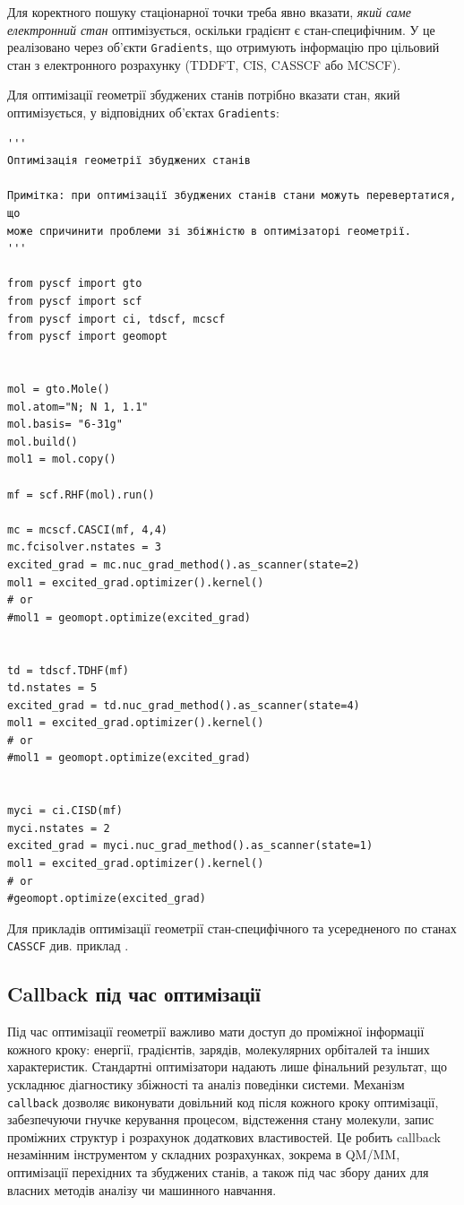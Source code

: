 Для коректного пошуку стаціонарної точки треба явно вказати,
\emph{який саме електронний стан} оптимізується, оскільки градієнт є
стан-специфічним. У \PySCF{} це реалізовано через об’єкти
\texttt{Gradients}, що отримують інформацію про цільовий стан з
електронного розрахунку (TDDFT, CIS, CASSCF або MCSCF).


Для оптимізації геометрії збуджених станів потрібно вказати стан, який оптимізується, у відповідних об'єктах \texttt{Gradients}:

\begin{verbatim}
'''
Оптимізація геометрії збуджених станів

Примітка: при оптимізації збуджених станів стани можуть перевертатися, що
може спричинити проблеми зі збіжністю в оптимізаторі геометрії.
'''

from pyscf import gto
from pyscf import scf
from pyscf import ci, tdscf, mcscf
from pyscf import geomopt


mol = gto.Mole()
mol.atom="N; N 1, 1.1"
mol.basis= "6-31g"
mol.build()
mol1 = mol.copy()

mf = scf.RHF(mol).run()

mc = mcscf.CASCI(mf, 4,4)
mc.fcisolver.nstates = 3
excited_grad = mc.nuc_grad_method().as_scanner(state=2)
mol1 = excited_grad.optimizer().kernel()
# or
#mol1 = geomopt.optimize(excited_grad)


td = tdscf.TDHF(mf)
td.nstates = 5
excited_grad = td.nuc_grad_method().as_scanner(state=4)
mol1 = excited_grad.optimizer().kernel()
# or
#mol1 = geomopt.optimize(excited_grad)


myci = ci.CISD(mf)
myci.nstates = 2
excited_grad = myci.nuc_grad_method().as_scanner(state=1)
mol1 = excited_grad.optimizer().kernel()
# or
#geomopt.optimize(excited_grad)
\end{verbatim}

Для прикладів оптимізації геометрії стан-специфічного та усередненого по станах \texttt{CASSCF} див. приклад .

\subsection{Callback під час оптимізації}

Під час оптимізації геометрії важливо мати доступ до проміжної інформації кожного кроку:
енергії, градієнтів, зарядів, молекулярних орбіталей та інших характеристик. Стандартні
оптимізатори надають лише фінальний результат, що ускладнює діагностику збіжності та
аналіз поведінки системи. Механізм \texttt{callback} дозволяє виконувати довільний код після
кожного кроку оптимізації, забезпечуючи гнучке керування процесом, відстеження стану
молекули, запис проміжних структур і розрахунок додаткових властивостей. Це робить
callback незамінним інструментом у складних розрахунках, зокрема в QM/MM, оптимізації
перехідних та збуджених станів, а також під час збору даних для власних методів аналізу чи
машинного навчання.

